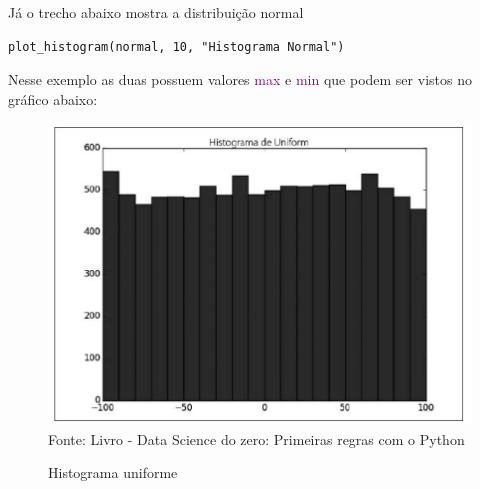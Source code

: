         Já o trecho abaixo mostra a distribuição normal
        
\begin{lstlisting}
plot_histogram(normal, 10, "Histograma Normal")
\end{lstlisting}

        Nesse exemplo as duas possuem valores \textcolor{purple}{max} e \textcolor{purple}{min} que podem ser vistos no gráfico abaixo: 
        
    \begin{figure}[H]
    \begin{center}
        \caption{Histograma uniforme} \label{ling1}
        \includegraphics[width=12cm]{Pictures/histograma-grafico.png} \\
        {\tiny \sf Fonte: Livro - Data Science do zero: Primeiras regras com o Python}
    \end{center}
   \end{figure}
